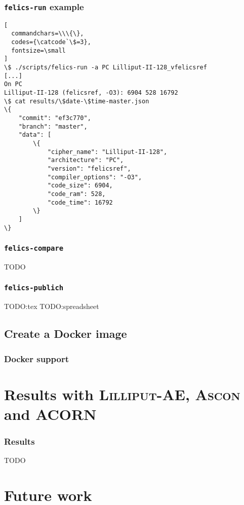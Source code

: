 \documentclass[english]{beamer}
\begin{document}
\begin{frame}[fragile]
  \frametitle{\texttt{felics-run} example}

\begin{Verbatim}[
  commandchars=\\\{\},
  codes={\catcode`\$=3},
  fontsize=\small
]
\$ ./scripts/felics-run -a PC Lilliput-II-128_vfelicsref
[...]
On PC
Lilliput-II-128 (felicsref, -O3): 6904 528 16792
\$ cat results/\$date-\$time-master.json
\{
    "commit": "ef3c770",
    "branch": "master",
    "data": [
        \{
            "cipher_name": "Lilliput-II-128",
            "architecture": "PC",
            "version": "felicsref",
            "compiler_options": "-O3",
            "code_size": 6904,
            "code_ram": 528,
            "code_time": 16792
        \}
    ]
\}
\end{Verbatim}

\end{frame}

\begin{frame}
  \frametitle{\texttt{felics-compare}}
  TODO
\end{frame}

\begin{frame}
  \frametitle{\texttt{felics-publich}}
  TODO:tex
  TODO:spreadsheet
\end{frame}

\subsection{Create a Docker image}

\begin{frame}
  \frametitle{Docker support}
\end{frame}

\section[Results]{Results with \textsc{Lilliput-AE}, \textsc{Ascon} and ACORN}

\begin{frame}
  \frametitle{Results}
  TODO
\end{frame}

\section[Future work]{Future work}
\end{document}
